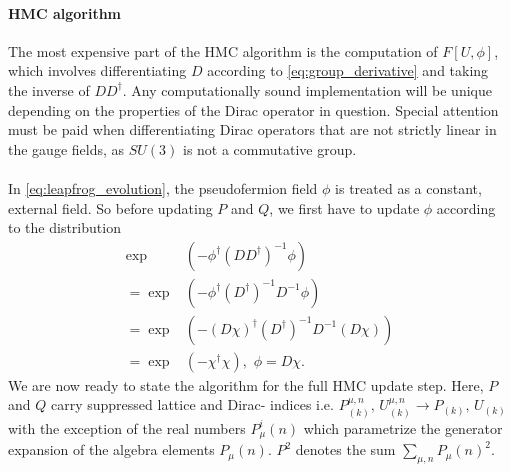 \documentclass[a4paper,10pt]{article}
\begin{document}
\paragraph{HMC algorithm}The most expensive part of the HMC algorithm is the computation of $F[U, \phi]$, which involves differentiating $D$ according to \eqref{eq:group_derivative} and taking the inverse of $DD^\dagger$. Any computationally sound implementation will be unique depending on the properties of the Dirac operator in question. Special attention must be paid when differentiating Dirac operators that are not strictly linear in the gauge fields, as $SU(3)$ is not a commutative group.\\\\In \eqref{eq:leapfrog_evolution}, the pseudofermion field $\phi$ is treated as a constant, external field. So before updating $P$ and $Q$, we first have to update $\phi$ according to the distribution
\begin{equation}
\begin{aligned} 
 \exp&\left(- \phi^{\dagger}\left(D D^{\dagger}\right)^{-1} \phi \right)
\\ = \exp&\left(- \phi^{\dagger} \left( D^{\dagger} \right)^{-1}D^{-1} \phi \right)\\=  \exp&\left(- \left( D\chi \right)^{\dagger} \left( D^{\dagger} \right)^{-1}D^{-1} \left( D\chi \right) \right)\\ = \exp&\left(- \chi^{\dagger} \chi  \right),\,\,\phi = D\chi.
\end{aligned}
\end{equation}
We are now ready to state the algorithm for the full HMC update step. Here, $P$ and $Q$ carry suppressed lattice and Dirac- indices i.e. $P^{\mu,n}_{(k)},\,U^{\mu,n}_{(k)}\rightarrow P_{(k)},\,U_{(k)}$ with the exception of the real numbers $P_{\mu}^{i}(n)$ which parametrize the generator expansion of the algebra elements $P_{\mu}(n)$. $P^2$ denotes the sum $\sum\limits_{\mu,n} P_{\mu}(n)^2$.
\end{document}
